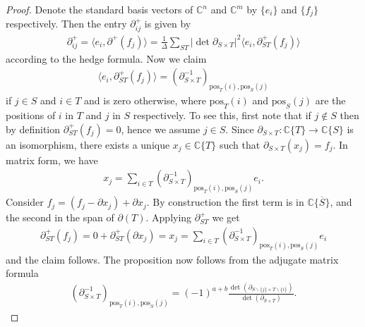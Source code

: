 \documentclass[10pt,a4paper]{amsart}
\def\C {{\mathbb C}}
\begin{document}
\begin{proof}
    Denote the standard basis vectors of $\C^n$ and $\C^m$ by $\{e_i\}$ and $\{f_j\}$ respectively. Then the entry $\partial^+_{ij}$ is given by
    \begin{align*}
        \partial^+_{ij} = \langle e_i, \partial^+(f_j) \rangle = \frac{1}{\Delta}\sum_{ST}|\det\partial_{S\times T}|^2 \langle e_i, \partial_{ST}^+(f_j) \rangle
    \end{align*}
    according to the hedge formula. Now we claim
    \begin{align*}
        \langle e_i, \partial_{ST}^+(f_j) \rangle = (\partial_{S\times T}^{-1})_{\mathrm{pos}_T(i),\mathrm{pos}_S(j)}
    \end{align*}
    if $j\in S$ and $i\in T$ and is zero otherwise, where $\mathrm{pos}_T(i)$ and $\mathrm{pos}_S(j)$ are the positions of $i$ in $T$ and $j$ in $S$ respectively. To see this, first note that if $j\not\in S$ then by definition $\partial_{ST}^+(f_j)=0$, hence we assume $j\in S$. Since $\partial_{S\times T}:\C\{T\}\rightarrow\C\{S\}$ is an isomorphism, there exists a unique $x_j\in \C\{T\}$ such that $\partial_{S\times T}(x_j)=f_j$. In matrix form, we have
    \begin{align*}
        x_j = \sum_{i\in T}(\partial_{S\times T}^{-1})_{\mathrm{pos}_T(i),\mathrm{pos}_S(j)} e_i.
    \end{align*}
    Consider $f_j = (f_j - \partial x_j) + \partial x_j$. By construction the first term is in $\C\{\overline{S}\}$, and the second in the span of $\partial(T)$. Applying $\partial_{ST}^{+}$ we get
    \begin{align*}
        \partial_{ST}^{+}(f_j) = 0 + \partial_{ST}^{+}(\partial x_j)= x_j = \sum_{i\in T}(\partial_{S\times T}^{-1})_{\mathrm{pos}_T(i),\mathrm{pos}_S(j)} e_i
    \end{align*}
    and the claim follows. The proposition now follows from the adjugate matrix formula
    \begin{align*}
        (\partial_{S\times T}^{-1})_{\mathrm{pos}_T(i),\mathrm{pos}_S(j)} = (-1)^{a+b} \frac{\det\left( \partial_{S\backslash\{j\} \times T\backslash\{i\}} \right)}{\det\left( \partial_{S\times T} \right)}.
    \end{align*}
\end{proof}
\end{document}

